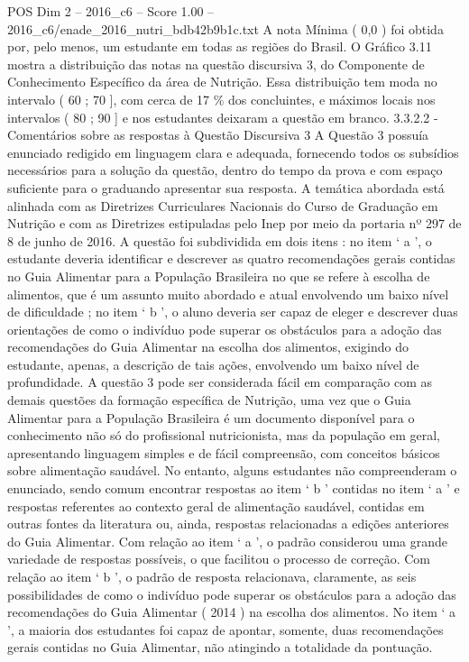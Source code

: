 \begin{textsample}{POS Dim 2 – 2016\_c6 – Score 1.00 – 2016\_c6/enade\_2016\_nutri\_bdb42b9b1c.txt}
A nota Mínima ( 0,0 ) foi obtida por, pelo menos, um estudante em todas as regiões do Brasil.
O Gráfico 3.11 mostra a distribuição das notas na questão discursiva 3, do Componente de Conhecimento Específico da área de Nutrição.
Essa distribuição tem moda no intervalo ( 60 ; 70 ], com cerca de 17 \% dos concluintes, e máximos locais nos intervalos ( 80 ; 90 ] e nos estudantes deixaram a questão em branco. 3.3.2.2 - Comentários sobre as respostas à Questão Discursiva 3 A Questão 3 possuía enunciado redigido em linguagem clara e adequada, fornecendo todos os subsídios necessários para a solução da questão, dentro do tempo da prova e com espaço suficiente para o graduando apresentar sua resposta.
A temática abordada está alinhada com as Diretrizes Curriculares Nacionais do Curso de Graduação em Nutrição e com as Diretrizes estipuladas pelo Inep por meio da portaria nº 297 de 8 de junho de 2016.
A questão foi subdividida em dois itens : no item ‘ a ’, o estudante deveria identificar e descrever as quatro recomendações gerais contidas no Guia Alimentar para a População Brasileira no que se refere à escolha de alimentos, que é um assunto muito abordado e atual envolvendo um baixo nível de dificuldade ; no item ‘ b ’, o aluno deveria ser capaz de eleger e descrever duas orientações de como o indivíduo pode superar os obstáculos para a adoção das recomendações do Guia Alimentar na escolha dos alimentos, exigindo do estudante, apenas, a descrição de tais ações, envolvendo um baixo nível de profundidade.
A questão 3 pode ser considerada fácil em comparação com as demais questões da formação específica de Nutrição, uma vez que o Guia Alimentar para a População Brasileira é um documento disponível para o conhecimento não só do profissional nutricionista, mas da população em geral, apresentando linguagem simples e de fácil compreensão, com conceitos básicos sobre alimentação saudável.
No entanto, alguns estudantes não compreenderam o enunciado, sendo comum encontrar respostas ao item ‘ b ’ contidas no item ‘ a ’ e respostas referentes ao contexto geral de alimentação saudável, contidas em outras fontes da literatura ou, ainda, respostas relacionadas a edições anteriores do Guia Alimentar.
Com relação ao item ‘ a ’, o padrão considerou uma grande variedade de respostas possíveis, o que facilitou o processo de correção.
Com relação ao item ‘ b ’, o padrão de resposta relacionava, claramente, as seis possibilidades de como o indivíduo pode superar os obstáculos para a adoção das recomendações do Guia Alimentar ( 2014 ) na escolha dos alimentos.
No item ‘ a ’, a maioria dos estudantes foi capaz de apontar, somente, duas recomendações gerais contidas no Guia Alimentar, não atingindo a totalidade da pontuação.

\end{textsample}
